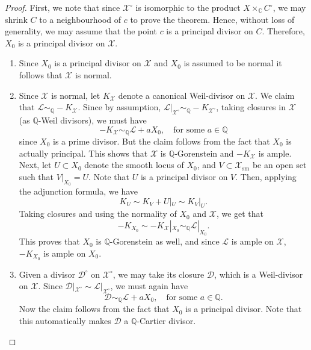 \documentclass[11pt,reqno]{amsart}
\newcommand{\C}{\mathbb{C}}
\newcommand{\Q}{\mathbb{Q}}
\newcommand{\cD}{\mathcal{D}}
\newcommand{\cL}{\mathcal{L}}
\newcommand{\cX}{\mathcal{X}}
\numberwithin{equation}{section}
\theoremstyle{definition}
\begin{document}
\begin{proof}
First, we note that since $\cX^{\circ}$ is isomorphic to the product $X \times_{\C} C^{\circ}$, we may shrink $C$ to a neighbourhood of $c$ to prove the theorem. Hence, without loss of generality, we may assume that the point $c$ is a principal divisor on $C$. Therefore, $X_{0}$ is a principal divisor on $\cX$.
    \begin{enumerate}
        \item Since $X_{0}$ is a principal divisor on $\cX$ and $X_{0}$ is assumed to be normal it follows that $\cX$ is normal.
        \item Since $\cX$ is normal, let $K_{\cX}$ denote a canonical Weil-divisor on $\cX$. We claim that $\cL \sim_{\Q} -K_{\cX}$. Since by assumption, $\cL|_{\cX^{\circ}} \sim_{\Q} -K_{\cX^{\circ}}$, taking closures in $\cX$ (as $\Q$-Weil divisors), we must have
        $$ -K_{\cX} \sim_{\Q} \cL + a X_{0}, \quad \text{for some $a \in \Q$} $$
        since $X_{0}$ is a prime divisor. But the claim follows from the fact that $X_{0}$ is actually principal. This shows that $\cX$ is $\Q$-Gorenstein and $-K_{\cX}$ is ample. \\
        Next, let $U \subset X_{0}$ denote the smooth locus of $X_{0}$, and $V \subset 
 \cX_{\text{sm}}$ be an open set such that $V|_{X_{0}} = U$. Note that $U$ is a principal divisor on $V$. Then, applying the adjunction formula, we have
 $$ K_U \sim K_V + U |_{U} \sim K_{V}|_U. $$
 Taking closures and using the normality of $X_{0}$ and $\cX$, we get that
 $$ -K_{X_{0}} \sim - K_{\cX}|_{X_{0}} \sim_{\Q} \cL|_{X_{0}} . $$
 This proves that $X_{0}$ is $\Q$-Gorenstein as well, and since $\cL$ is ample on $\cX$, $-K_{X_{0}}$ is ample on $X_{0}$.
 \item Given a divisor $\cD^{\circ}$ on $\cX^{\circ}$, we may take its closure $\cD$, which is a Weil-divisor on $\cX$. Since $\cD|_{\cX^{\circ}} \sim \cL|_{\cX^{\circ}}$, we must again have  
    $$ \cD \sim_{\Q} \cL + a X_{0}, \quad \text{for some $a \in \Q$}. $$
    Now the claim follows from the fact that $X_{0}$ is a principal divisor. Note that this automatically makes $\cD$ a $\Q$-Cartier divisor. \qedhere
    \end{enumerate}
\end{proof}
\end{document}
